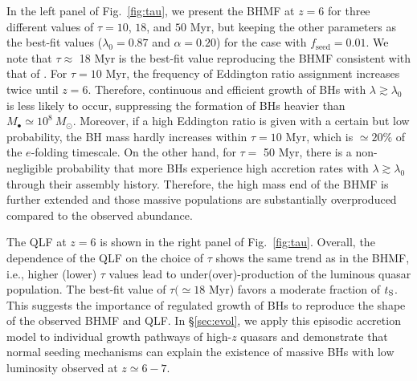 \documentclass[twocolumn, twocolappendix]{aastex63}
\newcommand{\Msun}{M_\odot}
\newcommand{\tlife}{\tau}
\newcommand{\fseed}{f_\mathrm{seed}}
\begin{document}
\begin{CJK*}{UTF8}{gbsn}
In the left panel of Fig.~\ref{fig:tau}, we present the BHMF at $z=6$ for three different values of $\tlife=10$, $18$, and $50$ Myr,
but keeping the other parameters as the best-fit values ($\lambda_0=0.87$ and $\alpha=0.20$) for the case with $\fseed=0.01$.
We note that $\tlife \approx$ 18 Myr is the best-fit value reproducing the BHMF consistent with that of .
For $\tlife=10$ Myr, the frequency of Eddington ratio assignment increases twice until $z=6$.
Therefore, continuous and efficient growth of BHs with $\lambda \gtrsim \lambda_0$ is less likely to occur,
suppressing the formation of BHs heavier than $M_\bullet \simeq 10^8~\Msun$.
Moreover, if a high Eddington ratio is given with a certain but low probability, the BH mass hardly increases
within $\tlife=10$ Myr, which is $\simeq 20\%$ of the $e$-folding timescale.
On the other hand, for $\tlife=$ 50 Myr, there is a non-negligible probability that
more BHs experience high accretion rates with $\lambda\gtrsim \lambda_0$ through their assembly history.
Therefore, the high mass end of the BHMF is further extended and those massive populations are substantially
overproduced compared to the observed abundance.

The QLF at $z=6$ is shown in the right panel of Fig.~\ref{fig:tau}.
Overall, the dependence of the QLF on the choice of $\tau$ shows the same trend as in the BHMF,
i.e., higher (lower) $\tlife$ values lead to under(over)-production of the luminous quasar population.
The best-fit value of $\tlife (\simeq 18$ Myr) favors a moderate fraction of $t_{\rm S}$.
This suggests the importance of regulated growth of BHs to reproduce the shape of the observed BHMF and QLF.
In \S\ref{sec:evol}, we apply this episodic accretion model to individual growth pathways of high-$z$ quasars
and demonstrate that normal seeding mechanisms can explain the existence of massive BHs with low luminosity
observed at $z\simeq 6-7$.


\end{CJK*}
\end{document}

